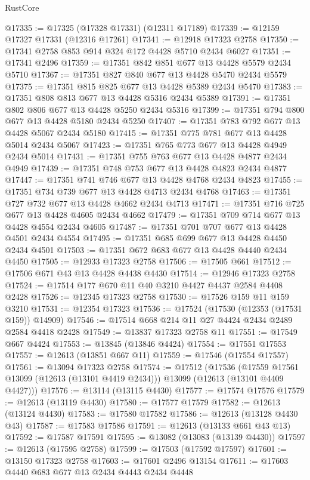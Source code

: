\begin{lexlean}{RustCore}
\begin{coremodule}
@17335 := @17325 (@17328 @17331) (@12311 @17189)
@17339 := @12159 @17327 @17331 (@12316 @17261)
@17341 := @12918 @17323 @2758
@17350 := @17341 @2758 @853 @914 @324 @172 @4428 @5710 @2434 @6027
@17351 := @17341 @2496
@17359 := @17351 @842 @851 @677 @13 @4428 @5579 @2434 @5710
@17367 := @17351 @827 @840 @677 @13 @4428 @5470 @2434 @5579
@17375 := @17351 @815 @825 @677 @13 @4428 @5389 @2434 @5470
@17383 := @17351 @808 @813 @677 @13 @4428 @5316 @2434 @5389
@17391 := @17351 @802 @806 @677 @13 @4428 @5250 @2434 @5316
@17399 := @17351 @794 @800 @677 @13 @4428 @5180 @2434 @5250
@17407 := @17351 @783 @792 @677 @13 @4428 @5067 @2434 @5180
@17415 := @17351 @775 @781 @677 @13 @4428 @5014 @2434 @5067
@17423 := @17351 @765 @773 @677 @13 @4428 @4949 @2434 @5014
@17431 := @17351 @755 @763 @677 @13 @4428 @4877 @2434 @4949
@17439 := @17351 @748 @753 @677 @13 @4428 @4823 @2434 @4877
@17447 := @17351 @741 @746 @677 @13 @4428 @4768 @2434 @4823
@17455 := @17351 @734 @739 @677 @13 @4428 @4713 @2434 @4768
@17463 := @17351 @727 @732 @677 @13 @4428 @4662 @2434 @4713
@17471 := @17351 @716 @725 @677 @13 @4428 @4605 @2434 @4662
@17479 := @17351 @709 @714 @677 @13 @4428 @4554 @2434 @4605
@17487 := @17351 @701 @707 @677 @13 @4428 @4501 @2434 @4554
@17495 := @17351 @685 @699 @677 @13 @4428 @4450 @2434 @4501
@17503 := @17351 @672 @683 @677 @13 @4428 @4440 @2434 @4450
@17505 := @12933 @17323 @2758
@17506 := @17505 @661
@17512 := @17506 @671 @43 @13 @4428 @4438 @4430
@17514 := @12946 @17323 @2758
@17524 := @17514 @177 @670 @11 @40 @3210 @4427 @4437 @2584 @4408 @2428
@17526 := @12345 @17323 @2758
@17530 := @17526 @159 @11 @159 @3210
@17531 := @12354 @17323
@17536 := @17524 (@17530 (@12353 (@17531 @159)) @14909)
@17546 := @17514 @668 @214 @11 @27 @4424 @2434 @2489 @2584 @4418 @2428
@17549 := @13837 @17323 @2758 @11
@17551 := @17549 @667 @4424
@17553 := @13845 (@13846 @4424)
@17554 := @17551 @17553
@17557 := @12613 (@13851 @667 @11)
@17559 := @17546 (@17554 @17557)
@17561 := @13094 @17323 @2758
@17574 := @17512
    (@17536
      (@17559 @17561 @13099 (@12613 (@13101 @4419 @2434)))
      @13099
      (@12613 (@13101 @4409 @4427)))
@17576 := @13114 (@13115 @4430)
@17577 := @17574 @17576
@17579 := @12613 (@13119 @4430)
@17580 := @17577 @17579
@17582 := @12613 (@13124 @4430)
@17583 := @17580 @17582
@17586 := @12613 (@13128 @4430 @43)
@17587 := @17583 @17586
@17591 := @12613 (@13133 @661 @43 @13)
@17592 := @17587 @17591
@17595 := @13082 (@13083 (@13139 @4430))
@17597 := @12613 (@17595 @2758)
@17599 := @17503 (@17592 @17597)
@17601 := @13150 @17323 @2758
@17603 := @17601 @2496 @13154
@17611 := @17603 @4440 @683 @677 @13 @2434 @4443 @2434 @4448

\end{coremodule}
\end{lexlean}
